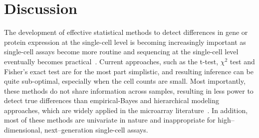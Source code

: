 \documentclass[12pt,oupdraft]{biostatistics}
\begin{document}
%

\section{Discussion}
\label{s:discussion}
The development of effective statistical methods to detect differences in gene or protein expression at the single-cell level is becoming increasingly important as single-cell assays become more routine and  sequencing at the single-cell level eventually becomes practical~\citep{Ramskold:2012gj}. Current approaches, such as the t-test, $\chi^2$ test and Fisher's exact test are for the most part simplistic, and resulting inference can be quite sub-optimal, especially when the cell counts are small. Most importantly, these methods do not share information across samples, resulting in less power to detect true differences than empirical-Bayes and hierarchical modeling approaches, which are widely applied in the microarray literature~\citep[e.g.][]{Newton2004,Gottardo:2006}. In addition, most of these methods are univariate in nature and inappropriate for high--dimensional, next--generation single-cell assays.
\end{document}
